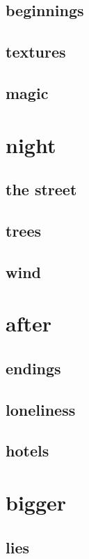 \documentclass{article}
\begin{document}
\subsection{beginnings}

\clearpage
\subsection{textures}

\clearpage
\subsection{magic}

\clearpage

\section{night}
\subsection{the street}

\clearpage
\subsection{trees}

\clearpage
\subsection{wind}

\clearpage

\section{after}
\subsection{endings}

\clearpage
\subsection{loneliness}

\clearpage
\subsection{hotels}

\clearpage

\section{bigger}
\subsection{lies}

\clearpage
\end{document}

